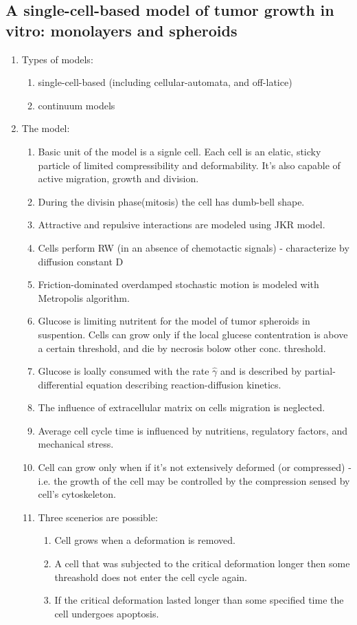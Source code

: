 \documentclass[10pt,a4paper]{article}
\begin{document}
\subsection{A single-cell-based model of tumor growth in vitro: monolayers and spheroids \cite{dd:05}} 
\begin{enumerate}
 \item Types of models:
 \begin{enumerate}
  \item single-cell-based (including cellular-automata, and off-latice)
  \item continuum models
 \end{enumerate}

 \item The model:
 \begin{enumerate}
  \item Basic unit of the model is a signle cell. Each cell is an elatic, sticky particle of limited compressibility and deformability.
  It's also capable of active migration, growth and division.
  \item During the divisin phase(mitosis) the cell has dumb-bell shape.
  \item Attractive and repulsive interactions are modeled using JKR model.
  \item Cells perform RW (in an absence of chemotactic signals) - characterize by diffusion constant D
  \item Friction-dominated overdamped stochastic motion is modeled with Metropolis algorithm.
  \item Glucose is limiting nutritent for the model of tumor spheroids in suspention.
  Cells can grow only if the local glucese contentration is above a certain threshold, and die by necrosis bolow other conc. threshold.
  \item Glucose is loally consumed with the rate $\hat{\gamma}$ and is described by partial-differential equation describing reaction-diffusion kinetics.
  \item The influence of extracellular matrix on cells migration is neglected.
  \item Average cell cycle time is influenced by nutritiens, regulatory factors, and mechanical stress.
  \item Cell can grow only when if it's not extensively deformed (or compressed) - i.e. the growth of the cell may be controlled by the compression sensed by cell's cytoskeleton.
  \item Three scenerios are possible:
  \begin{enumerate}
   \item Cell grows when a deformation is removed.
   \item A cell that was subjected to the critical deformation longer then some threashold does not enter the cell cycle again.
   \item If the critical deformation lasted longer than some specified time the cell undergoes apoptosis.
  \end{enumerate}


\end{enumerate}
\end{enumerate}
\end{document}
